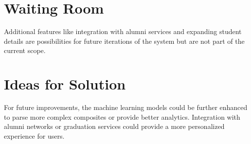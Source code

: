 \documentclass[12pt]{article}
\begin{document}
\section{Waiting Room}

Additional features like integration with alumni services and expanding student details are possibilities for future iterations of the system but are not part of the current scope.

\section{Ideas for Solution}

For future improvements, the machine learning models could be further enhanced to parse more complex composites or provide better analytics. Integration with alumni networks or graduation services could provide a more personalized experience for users.
\end{document}
